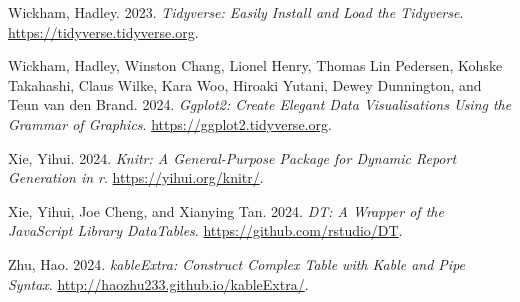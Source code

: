 \documentclass[
  letterpaper,
  DIV=11,
  numbers=noendperiod]{scrreprt}
\newlength{\cslhangindent}
\newenvironment{CSLReferences}[2] %
 {\begin{list}{}{%
  \setlength{\itemindent}{0pt}
  \setlength{\leftmargin}{0pt}
  \setlength{\parsep}{0pt}
  \ifodd #1
   \setlength{\leftmargin}{\cslhangindent}
   \setlength{\itemindent}{-1\cslhangindent}
  \fi
  \setlength{\itemsep}{#2\baselineskip}}}
 {\end{list}}
\begin{document}
\begin{CSLReferences}{1}{0}
Wickham, Hadley. 2023. \emph{Tidyverse: Easily Install and Load the
Tidyverse}. \url{https://tidyverse.tidyverse.org}.

Wickham, Hadley, Winston Chang, Lionel Henry, Thomas Lin Pedersen,
Kohske Takahashi, Claus Wilke, Kara Woo, Hiroaki Yutani, Dewey
Dunnington, and Teun van den Brand. 2024. \emph{Ggplot2: Create Elegant
Data Visualisations Using the Grammar of Graphics}.
\url{https://ggplot2.tidyverse.org}.

Xie, Yihui. 2024. \emph{Knitr: A General-Purpose Package for Dynamic
Report Generation in r}. \url{https://yihui.org/knitr/}.

Xie, Yihui, Joe Cheng, and Xianying Tan. 2024. \emph{DT: A Wrapper of
the JavaScript Library DataTables}. \url{https://github.com/rstudio/DT}.

Zhu, Hao. 2024. \emph{kableExtra: Construct Complex Table with Kable and
Pipe Syntax}. \url{http://haozhu233.github.io/kableExtra/}.

\end{CSLReferences}
\end{document}
